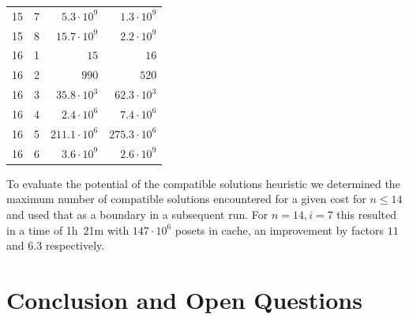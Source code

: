\documentclass[twoside,leqno,twocolumn]{article}
\begin{document}
\begin{table}[!t]
\begin{tabular}{c|c|r|r}
    15  & 7   & $5.3 \cdot 10^9$        & $1.3 \cdot 10^9$         \\
    15  & 8   & $15.7 \cdot 10^9$       & $2.2 \cdot 10^9$         \\
    \hline
    16  & 1   & $15$                    & $16$                     \\
    16  & 2   & $990$                   & $520$                    \\
    16  & 3   & $35.8 \cdot 10^3$       & $62.3 \cdot 10^3$        \\
    16  & 4   & $2.4 \cdot 10^6$        & $7.4 \cdot 10^6$         \\
    16  & 5   & $211.1 \cdot 10^6$      & $275.3 \cdot 10^6$       \\
    16  & 6   & $3.6 \cdot 10^9$        & $2.6 \cdot 10^9$         \\
  \end{tabular}
\end{table}

To evaluate the potential of the compatible solutions heuristic we determined the maximum number of compatible solutions encountered for a given cost for $n\leq 14$ and used that as a boundary in a subsequent run.
For $n=14,i=7$ this resulted in a time of 1h~21m with $147\cdot10^6$ posets in cache, an improvement by factors $11$ and $6.3$ respectively. %


\section{Conclusion and Open Questions}

\end{document}
